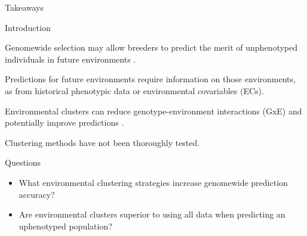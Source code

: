 \documentclass[final]{beamer}
\newlength{\onecolwid}
\begin{document}
\begin{frame}[t]
\begin{columns}[t]
\begin{column}{\onecolwid}
\begin{alertblock}{\Large{Takeaways}}

\end{alertblock}


\begin{block}{Introduction}


Genomewide selection may allow breeders to predict the merit of unphenotyped individuals in future environments \cite{Malosetti2016a, Jarquin2017}.

\vspace{0.5cm}

Predictions for future environments require information on those environments, as from historical phenotypic data or environmental covariables (ECs).

\vspace{0.5cm}

Environmental clusters can reduce genotype-environment interactions (GxE)\cite{Bernardo2010} and potentially improve predictions \cite{Lado2016a}.

\vspace{0.5cm}

Clustering methods have not been thoroughly tested.



\end{block}




\begin{alertblock}{\large{Questions}}

\begin{footnotesize}

\begin{itemize}
  \item What environmental clustering strategies increase genomewide prediction accuracy?
  \item Are environmental clusters superior to using all data when predicting an uphenotyped population?
\end{itemize}


\end{footnotesize}
\end{alertblock}
\end{column}
\end{columns}
\end{frame}
\end{document}
